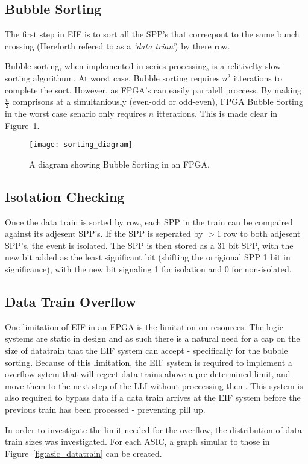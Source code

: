 		\subsection{Bubble Sorting}

		The first step in EIF is to sort all the SPP's that correcpont to the same bunch crossing (Hereforth refered to as a \textit{`data trian'}) by there row.
		\par
		Bubble sorting, when implemented in series processing, is a relitivelty slow sorting algorithum.
		At worst case, Bubble sorting requires $n^2$ itterations to complete the sort.
		However, as FPGA's can easily parralell proccess.
		By making $\frac{n}{2}$ comprisons at a simultaniously (even-odd or odd-even), FPGA Bubble Sorting in the worst case senario only requires $n$ itterations. This is made clear in Figure~\ref{fig:sorting}.

		\begin{figure}[ht]
			\centering
			\texttt{[image: sorting\_diagram]}
			\caption{A diagram showing Bubble Sorting in an FPGA.}
			\label{fig:sorting}
		\end{figure}

	\subsection{Isotation Checking}

		Once the data train is sorted by row, each SPP in the train can be compaired against its adjesent SPP's.
		If the SPP is seperated by $>1$ row to both adjesent SPP's, the event is isolated.
		The SPP is then stored as a 31 bit SPP, with the new bit added as the least significant bit (shifting the orrigional SPP 1 bit in significance), with the new bit signaling 1 for isolation and 0 for non-isolated. 

	\subsection{Data Train Overflow} %
	\label{sub:data_train_overflow}
		
		One limitation of EIF in an FPGA is the limitation on resources. 
		The logic systems are static in design and as such there is a natural need for a cap on the size of datatrain that the EIF system can accept - specifically for the bubble sorting.
		Because of this limitation, the EIF system is required to implement a overflow sytem that will regect data trains above a pre-determined limit, and move them to the next step of the LLI without proccessing them.
		This system is also required to bypass data if a data train arrives at the EIF system before the previous train has been processed - preventing pill up.
		\par
		In order to investigate the limit needed for the overflow, the distribution of data train sizes was investigated. For each ASIC, a graph simular to those in Figure~\ref{fig:asic_datatrain} can be created.

